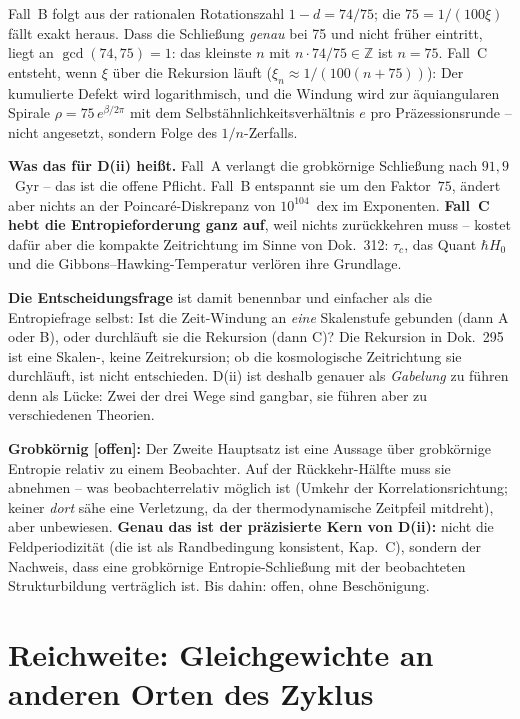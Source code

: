 \noindent Fall~B folgt aus der rationalen Rotationszahl
$1-d = 74/75$; die $75 = 1/(100\xi)$ fällt exakt heraus. Dass die
Schließung \emph{genau} bei 75 und nicht früher eintritt, liegt an
$\gcd(74,75) = 1$: das kleinste $n$ mit $n\cdot 74/75 \in
\mathbb{Z}$ ist $n = 75$. Fall~C
entsteht, wenn $\xi$ über die Rekursion läuft
($\xi_n \approx 1/(100(n{+}75))$): Der kumulierte Defekt wird
logarithmisch, und die Windung wird zur äquiangularen Spirale
$\rho = 75\,e^{\beta/2\pi}$ mit dem Selbstähnlichkeitsverhältnis
$e$ pro Präzessionsrunde -- nicht angesetzt, sondern Folge des
$1/n$-Zerfalls.

\textbf{Was das für D(ii) heißt.} Fall~A verlangt die
grobkörnige Schließung nach $91{,}9$~Gyr -- das ist die offene
Pflicht. Fall~B entspannt sie um den Faktor~$75$, ändert aber
nichts an der Poincaré-Diskrepanz von $10^{104}$~dex im Exponenten.
\textbf{Fall~C hebt die Entropieforderung ganz auf}, weil nichts
zurückkehren muss -- kostet dafür aber die kompakte Zeitrichtung
im Sinne von Dok.~312: $\tau_c$, das Quant $\hbar H_0$ und die
Gibbons--Hawking-Temperatur verlören ihre Grundlage.

\textbf{Die Entscheidungsfrage} ist damit benennbar und
einfacher als die Entropiefrage selbst: Ist die Zeit-Windung an
\emph{eine} Skalenstufe gebunden (dann A oder B), oder durchläuft
sie die Rekursion (dann C)? Die Rekursion in Dok.~295 ist eine
Skalen-, keine Zeitrekursion; ob die kosmologische Zeitrichtung
sie durchläuft, ist nicht entschieden. D(ii) ist deshalb genauer
als \emph{Gabelung} zu führen denn als Lücke: Zwei der drei Wege
sind gangbar, sie führen aber zu verschiedenen Theorien.

\textbf{Grobkörnig [offen]:} Der Zweite Hauptsatz ist eine
Aussage über grobkörnige Entropie relativ zu einem Beobachter.
Auf der Rückkehr-Hälfte muss sie abnehmen -- was beobachterrelativ
möglich ist (Umkehr der Korrelationsrichtung; keiner
\emph{dort} sähe eine Verletzung, da der thermodynamische
Zeitpfeil mitdreht), aber unbewiesen. \textbf{Genau das ist der
präzisierte Kern von D(ii):} nicht die Feldperiodizität (die ist
als Randbedingung konsistent, Kap.~C), sondern der Nachweis, dass
eine grobkörnige Entropie-Schließung mit der beobachteten
Strukturbildung verträglich ist. Bis dahin: offen, ohne
Beschönigung.

\section{Reichweite: Gleichgewichte an anderen Orten des Zyklus}

